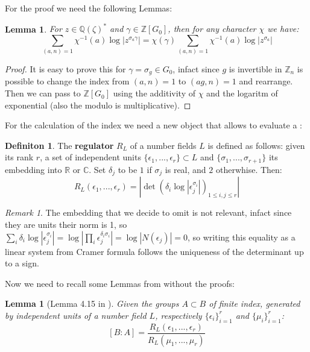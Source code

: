 \documentclass[]{article}
\theoremstyle{plain}
\newtheorem{lem}[teo]{Lemma}
\theoremstyle{remark}
\newtheorem{rem}{Remark}
\theoremstyle{definition}
\newtheorem{deff}[teo]{Definiton}
\newcommand{\Z}{\mathbb{Z}}
\newcommand{\Q}{\mathbb{Q}}
\newcommand{\C}{\mathbb{C}}
\newcommand{\R}{\mathbb{R}}
\begin{document}
	For the proof we need the following Lemmas:
	
	\begin{lem} \label{lem:fact}
		For $ z \in \Q (\zeta )^\ast  $ and $ \gamma \in \Z [G_0] $, then for any character $\chi$ we have:
		\begin{equation} \label{eq:fact}
			\sum_{(a,n)=1} \chi ^{-1} (a) \log | z ^{\sigma_a \gamma }| = \chi (\gamma) \sum_{(a,n)=1} \chi ^{-1}(a) \log | z ^{\sigma_a  }|
		\end{equation}
	\end{lem}
	\begin{proof}
		It is easy to prove this for $\gamma = \sigma_g \in G_0$, infact since $ g $ is invertible in $ \Z_{n} $ is possible to change the index from $ (a,n)=1 $ to $ (ag,n)=1 $ and rearrange. Then we can pass to $ \Z[G_0] $ using the additivity of $ \chi $ and the logaritm of exponential (also the modulo is multiplicative).
	\end{proof}

	For the calculation of the index we need a new object that allows to evaluate a :
	\begin{deff}
		The \textbf{regulator} $ R_L $ of a number fields $ L $ is defined as follows:
		given its rank $ r $, a set of independent units $ \{\epsilon_1 , ... , \epsilon_r\} \subset L$ and $ \{ \sigma_1 , ... , \sigma_{r+1} \} $ its embedding into $ \R $ or $ \C $. Set $ \delta_j $ to be $ 1 $ if $ \sigma_j $ is real, and $ 2 $ otherwhise. \newline
		Then:
		\begin{equation}
			R_L(\epsilon_1 , ... , \epsilon_r) = | \det (\delta_i \log | \epsilon_j ^{\sigma_i}|)_{1\leq i,j\leq r} |
		\end{equation}
	\end{deff}
	
	\begin{rem} \label{rem:reg}
		The embedding that we decide to omit is not relevant, infact since they are units their norm is 1, so $ \sum_i  \delta_i \log | \epsilon_j ^{\sigma_i}| =\log | \prod_i \epsilon_j^{\delta_i \sigma_i }|=\log |N(\epsilon_j)| = 0$, so writing this equality as a linear system from Cramer formula follows the uniqueness of the determinant up to a sign. %
	\end{rem}

	Now we need to recall some Lemmas from \cite{CF} without the proofs: 
	
	\begin{lem}[Lemma 4.15 in \cite{CF}]
		\label{lem:index_reg}
		Given the groups $ A \subset B $ of finite index, generated by independent units of a number field $ L $, respectively $ \{\epsilon_i\}_{i=1}^r $ and $ \{\mu_i\}_{i=1}^r $:
		\begin{equation} \label{eq:index_reg}
			[B:A]= \frac{R_L(\epsilon_1 , ... , \epsilon_r) }{R_L(\mu_1 , ... , \mu_r) }
		\end{equation}
	\end{lem}
\end{document}
